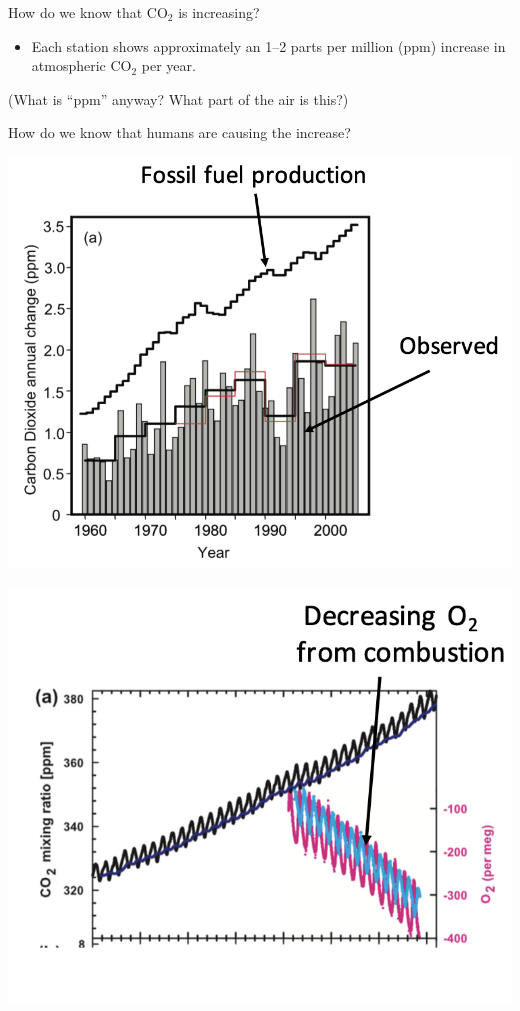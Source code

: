 \documentclass[12pt]{beamer}
\begin{document}
\begin{frame}{How do we know that $\text{CO}_2$ is increasing?}
\begin{itemize}
\item Each station shows approximately an 1--2 parts per million (ppm) increase in atmospheric $\text{CO}_2$ per year.
\end{itemize}

{\small (What is ``ppm'' anyway?  What part of the air is this?)}
\end{frame}
\begin{frame}{How do we know that humans are causing the increase?}

\begin{center}
\begin{minipage}{0.48\textwidth}
\vspace{0pt}
\includegraphics[width=\textwidth]{images/jeevanjee_human-caused-CO2_1.png}
\end{minipage} %
\hfill %
\begin{minipage}{0.48\textwidth}
\vspace{0pt}
\includegraphics[width=\textwidth]{images/jeevanjee_human-caused-CO2_2.png}
\end{minipage}
\end{center}
%


\end{frame}
\end{document}
